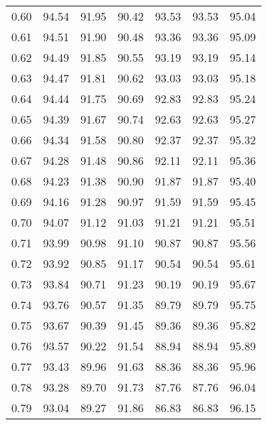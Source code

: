 \begin{tabular}{|c|c|c|c|c|c|c|}
      0.60 &     94.54 &     91.95 &      90.42 &   93.53 &      93.53 &         95.04 \\
      0.61 &     94.51 &     91.90 &      90.48 &   93.36 &      93.36 &         95.09 \\
      0.62 &     94.49 &     91.85 &      90.55 &   93.19 &      93.19 &         95.14 \\
      0.63 &     94.47 &     91.81 &      90.62 &   93.03 &      93.03 &         95.18 \\
      0.64 &     94.44 &     91.75 &      90.69 &   92.83 &      92.83 &         95.24 \\
      0.65 &     94.39 &     91.67 &      90.74 &   92.63 &      92.63 &         95.27 \\
      0.66 &     94.34 &     91.58 &      90.80 &   92.37 &      92.37 &         95.32 \\
      0.67 &     94.28 &     91.48 &      90.86 &   92.11 &      92.11 &         95.36 \\
      0.68 &     94.23 &     91.38 &      90.90 &   91.87 &      91.87 &         95.40 \\
      0.69 &     94.16 &     91.28 &      90.97 &   91.59 &      91.59 &         95.45 \\
      0.70 &     94.07 &     91.12 &      91.03 &   91.21 &      91.21 &         95.51 \\
      0.71 &     93.99 &     90.98 &      91.10 &   90.87 &      90.87 &         95.56 \\
      0.72 &     93.92 &     90.85 &      91.17 &   90.54 &      90.54 &         95.61 \\
      0.73 &     93.84 &     90.71 &      91.23 &   90.19 &      90.19 &         95.67 \\
      0.74 &     93.76 &     90.57 &      91.35 &   89.79 &      89.79 &         95.75 \\
      0.75 &     93.67 &     90.39 &      91.45 &   89.36 &      89.36 &         95.82 \\
      0.76 &     93.57 &     90.22 &      91.54 &   88.94 &      88.94 &         95.89 \\
      0.77 &     93.43 &     89.96 &      91.63 &   88.36 &      88.36 &         95.96 \\
      0.78 &     93.28 &     89.70 &      91.73 &   87.76 &      87.76 &         96.04 \\
      0.79 &     93.04 &     89.27 &      91.86 &   86.83 &      86.83 &         96.15 \\

\end{tabular}
